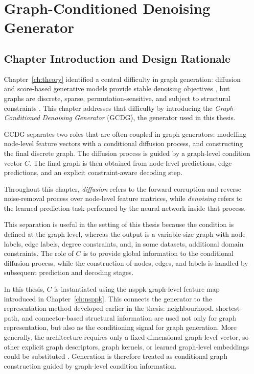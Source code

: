 \chapter{Graph-Conditioned Denoising Generator}
\label{ch:generator}

\section{Chapter Introduction and Design Rationale}
\label{sec:generator:introduction}

Chapter~\ref{ch:theory} identified a central difficulty in graph generation:
diffusion and score-based generative models provide stable denoising objectives
\citep{ho2020ddpm,song2020score}, but graphs are discrete, sparse,
permutation-sensitive, and subject to structural constraints
\citep{you2018graphrnn,niu2020permutation,vignac2022digress}. This chapter
addresses that difficulty by introducing the
\emph{Graph-Conditioned Denoising Generator} (GCDG), the generator used in this
thesis.

GCDG separates two roles that are often coupled in graph generators: modelling
node-level feature vectors with a conditional diffusion process, and
constructing the final discrete graph. The diffusion process is guided by a
graph-level condition vector \(C\). The final graph is then obtained from
node-level predictions, edge predictions, and an explicit constraint-aware
decoding step.

Throughout this chapter, \emph{diffusion} refers to the forward corruption and
reverse noise-removal process over node-level feature matrices, while
\emph{denoising} refers to the learned prediction task performed by the neural
network inside that process.

This separation is useful in the setting of this thesis because the condition is
defined at the graph level, whereas the output is a variable-size graph with
node labels, edge labels, degree constraints, and, in some datasets, additional
domain constraints. The role of \(C\) is to provide global information to the
conditional diffusion process, while the construction of nodes, edges, and
labels is handled by subsequent prediction and decoding stages.

In this thesis, \(C\) is instantiated using the \gls{nsppk} graph-level feature
map introduced in Chapter~\ref{ch:nsppk}. This connects the generator to the
representation method developed earlier in the thesis: neighbourhood,
shortest-path, and connector-based structural information are used not only for
graph representation, but also as the conditioning signal for graph generation.
More generally, the architecture requires only a fixed-dimensional graph-level
vector, so other explicit graph descriptors, graph kernels, or learned
graph-level embeddings could be substituted
\citep{costa2010fast,neumann2016propagation,borgwardt2020graphkernels,
hamilton2017graphsage,zhang2018endtoend,dwivedi2021graph}. Generation is
therefore treated as conditional graph construction guided by graph-level
condition information.

